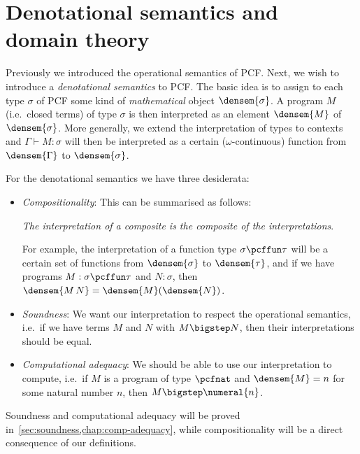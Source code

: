 \chapter[{Denotational semantics and domain theory}]{Denotational semantics and \\ domain theory}\label{chap:domains}

Previously we introduced the operational semantics of PCF. Next, we wish to
introduce a \emph{denotational semantics} to PCF. The basic idea is to assign to
each type \(\sigma\) of PCF some kind of \emph{mathematical} object
\(\densem{\sigma}\).
%
A program \(M\) (i.e.\ closed terms) of type \(\sigma\) is then interpreted as
an element \(\densem{M}\) of \(\densem{\sigma}\).
%
More generally, we extend the interpretation of types to contexts and
\(\Gamma \vdash M : \sigma\) will then be interpreted as a certain
(\(\omega\)-continuous) function from \(\densem{\Gamma}\) to
\(\densem{\sigma}\).

For the denotational semantics we have three desiderata:

\begin{itemize}[itemsep=2mm,topsep=3mm]
\item\emph{Compositionality}: This can be summarised as follows:
  \begin{displayquote}
    \emph{The interpretation of a composite is the composite of the interpretations}.
  \end{displayquote}

  For example, the interpretation of a function type \(\sigma \pcffun \tau\)
  will be a certain set of functions from \(\densem{\sigma}\) to
  \(\densem{\tau}\), and if we have programs \(M : \sigma \pcffun \tau\) and
  \(N : \sigma\), then \(\densem{M \, N} = \densem{M}(\densem{N})\).
\item\emph{Soundness}: We want our interpretation to respect the operational
  semantics, i.e.\ if we have terms \(M\) and \(N\) with
  \(M \bigstep N\), then their interpretations should be equal.
\item\emph{Computational adequacy}: We should be able to use our
  interpretation to compute, i.e.\ if \(M\) is a program of type \(\pcfnat\)
  and \(\densem{M} = n\) for some natural number \(n\), then
  \(M \bigstep \numeral{n}\).
\end{itemize}

Soundness and computational adequacy will be proved
in~\cref{sec:soundness,chap:comp-adequacy}, while compositionality will be a
direct consequence of our definitions.

